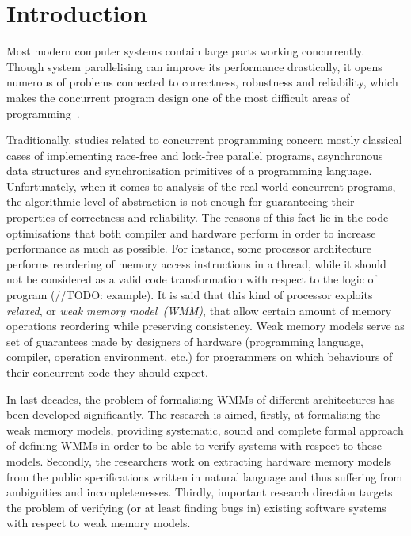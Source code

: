 \chapter{Introduction}
\label{section:introduction}

Most modern computer systems contain large parts working concurrently. Though system parallelising can improve its performance drastically, it opens numerous of problems connected to correctness, robustness and reliability, which makes the concurrent program design one of the most difficult areas of programming~\cite{mckenney2017parallel}.

Traditionally, studies related to concurrent programming concern mostly classical cases of implementing race-free and lock-free parallel programs, asynchronous data structures and synchronisation primitives of a programming language. Unfortunately, 
when it comes to 
analysis of the real-world concurrent programs, the algorithmic level of abstraction is not enough for guaranteeing their properties of correctness and reliability. The reasons of this fact lie in the code optimisations that both compiler and hardware perform in order to increase performance as much as possible. For instance, some processor architecture performs reordering of memory access instructions in a thread, while it should not be considered as a valid code transformation with respect to the logic of program (//TODO: example). It is said that this kind of processor exploits \textit{relaxed}, or \textit{weak memory model~(WMM)}, that allow certain amount of memory operations reordering while preserving consistency. Weak memory models serve as set of guarantees made by designers of hardware (programming language, compiler, operation environment, etc.) for programmers on which behaviours of their concurrent code they should expect.

In last decades, the problem of formalising WMMs of different 
architectures has been developed significantly. The research is aimed, firstly, at formalising the weak memory models, providing systematic, sound and complete formal approach of defining WMMs in order to be able to verify systems with respect to these models. Secondly, the researchers work on extracting hardware memory models from the public specifications written in natural language and thus suffering from ambiguities and incompletenesses. Thirdly, important research direction targets the problem of verifying (or at least finding bugs in) existing software systems with respect to weak memory models. 

